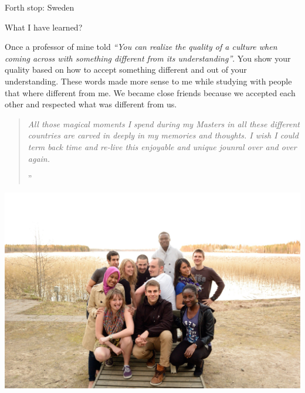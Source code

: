 \documentclass[10pt,a4paper]{article} %
\newcommand{\NewsItem}[1]{ %
\usefont{T1}{fvs}{n}{n} %
\vspace{24pt}\large #1\vspace{3pt} %
\par \normalsize \normalfont}
\begin{document}
\begin{multicols}{3}


\NewsItem{Forth stop: Sweden}




\NewsItem{What I have learned?}

Once a professor of mine told \textit{``You can realize the 
	quality of a culture when coming across with something different 
	from its understanding''}. 
You show your quality based on how to accept something different and 
out of your understanding.
These words made more sense to me while studying with people that where different 
from me. 
We became close friends because we accepted each other and respected what was 
different from us. 
 




\begin{quotation} %

\noindent\normalsize\textit{All those magical moments I spend during my 
	Masters in all these different countries are carved in deeply in my 
	memories and thoughts. 
	I wish I could term back time and re-live this enjoyable and unique 
	jounral over and over again.
}

\hfill{\Huge''}

\end{quotation}


\end{multicols}


\begin{center}
	\vspace{10pt}
	\includegraphics[width=0.8\linewidth]{media/perccom_family.jpg} %

	\vspace{10pt}
\end{center}
\end{document}
